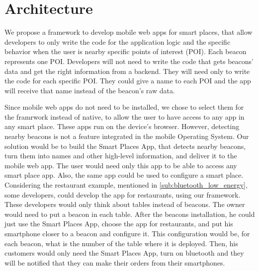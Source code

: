 
% 
% 

\section{Architecture}
\label{sec:architecture}
We propose a framework to develop mobile web apps for smart
places, that allow developers to only write the code
for the application logic and the specific behavior when
the user is nearby specific points of interest (POI).
Each beacon represents one POI. Developers will not need
to write the code that gets beacons' data and get the
right information from a backend. They will need only
to write the code for each specific POI. They could give
a name to each POI and the app will receive that name 
instead of the beacon's raw data. 

Since mobile web apps do not need to be installed, 
we chose to select
them for the framrwork instead of native, to allow
the user to have access to any app in any smart place.
These apps run on the device's browser. However, detecting
nearby beacons is not a feature integrated in the mobile
Operating System. Our solution would be to build the
Smart Places App,
that detects nearby beacons, turn them into names and
other high-level information, and deliver it to the
mobile web app. The user would need only this app to
be able to access any smart place app. Also, the same app
could be used to configure a smart place.
Considering the restaurant example, mentioned in
\ref{sub:bluetooth_low_energy}, some
developers, could develop the app for restaurants,
using our framework. These developers would only think
about tables instead of beacons. The owner would need
to put a beacon in each table. After the beacons
installation, he could just use the Smart Places App,
choose the app for restaurants, and put his smartphone
closer to a beacon and configure it. This configuration
would be, for each beacon, what is the number of the table
where it is deployed. Then, his customers would only
need the Smart Places App, turn on bluetooth and they will
be notified that they can make their orders from their
smartphones.

